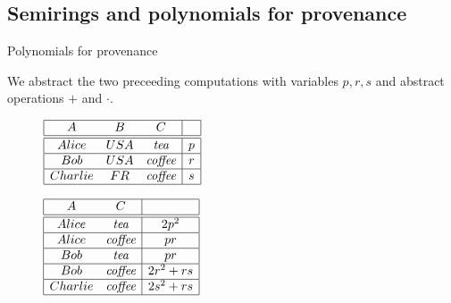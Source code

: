 \documentclass[11pt]{beamer}
\begin{document}
\subsection{Semirings and polynomials for provenance}
\begin{frame}{Polynomials for provenance}

We abstract the two preceeding computations with variables $p,r,s$ and abstract operations $+$ and $\cdot$.

\begin{figure}
$\begin{array}{| c  c  c |  c |}
            \hline
            A & B & C &  \\
            \hline 
            \hline
            Alice & USA & \textit{tea} & p \\
            \hline
            Bob & USA & \textit{coffee} & r \\
            \hline
            Charlie & FR & \textit{coffee} & s \\
            \hline
        \end{array}$

\end{figure}

\begin{figure}
$\begin{array}{| c  c  | c |}
            \hline
            A & C & \\
            \hline 
            \hline
            Alice & \textit{tea} & 2p^2 \\
            \hline
            Alice & \textit{coffee} & pr \\
            \hline
            Bob & \textit{tea} & pr \\
            \hline
            Bob & \textit{coffee} & 2r^2 + rs\\
            \hline
            Charlie & \textit{coffee} & 2s^2 + rs \\
            \hline
           \end{array}$
\end{figure}

\end{frame}
\end{document}

